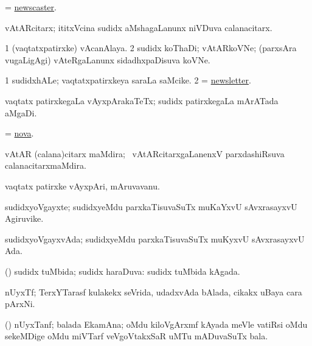 \bentry
{}
\gl{\nA}
\bmng
= \hyperlink{newscaster}{newscaster}. 
\emng
\eentry

\bentry
{}
\gl{\nA}
\bmng
vAtARcitarx; ititxVcina sudidx aMshagaLanunx niVDuva calanacitarx. 
\emng
\eentry

\bentry
{}
\gl{\nA}
\bmng
\bnum
\num{1} (vaqtatxpatirxke) vAcanAlaya. 
\num{2} sudidx koThaDi; vAtARkoVNe; (parxsAra \mo vugaLigAgi) vAteRgaLanunx sidadhxpaDisuva koVNe. 
\enum
\emng
\eentry

\bentry
{}
\gl{\nA}
\bmng
\bnum
\num{1} sudidxhALe; vaqtatxpatirxkeya saraLa saMcike. 
\num{2} = \hyperlink{newsletter}{newsletter}. 
\enum
\emng
\eentry

\bentry
{}
\gl{\nA}
\bmng
vaqtatx patirxkegaLa vAyxpArakaTeTx; sudidx patirxkegaLa mArATada aMgaDi. 
\emng
\eentry

\bentry
{}
\gl{\nA}
\bmng
= \hyperlink{nova}{nova}. 
\emng
\eentry

\bentry
{}
\gl{\nA}
\bmng
vAtAR (calana)citarx maMdira; \kanmu\ vAtARcitarxgaLanenxV parxdashiRsuva calanacitarxmaMdira. 
\emng
\eentry

\bentry
{}
\gl{\nA}
\bmng
vaqtatx patirxke vAyxpAri, mAruvavanu. 
\emng
\eentry

\bentry
{}
\gl{\nA}
\bmng
sudidxyoVgayxte; sudidxyeMdu parxkaTisuvaSuTx muKaYxvU sAvxrasayxvU Agiruvike. 
\emng
\eentry

\bentry
{}
\gl{\gu}
\bmng
sudidxyoVgayxvAda; sudidxyeMdu parxkaTisuvaSuTx muKyxvU sAvxrasayxvU Ada. 
\emng
\eentry

\bentry
{}
\gl{\gu}
\bmng
(\AmA) sudidx tuMbida; sudidx haraDuva:  sudidx tuMbida kAgada. 
\emng
\eentry

\bentry
{}
\gl{\nA}
\bmng
nUyxTf; TerxYTarasf kulakekx seVrida, udadxvAda bAlada, cikakx uBaya cara pArxNi.  
\emng
\eentry

\bentry
{}
\gl{\nA}
\bmng
(\Bwvi) nUyxTanf; balada EkamAna; oMdu kiloVgArxmf kAyada meVle vatiRsi oMdu sekeMDige oMdu miVTarf veVgoVtakxSaR uMTu mADuvaSuTx bala. 
\emng
\eentry

